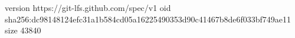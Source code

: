 version https://git-lfs.github.com/spec/v1
oid sha256:dc98148124efc31a1b584cd05a16225490353d90c41467b8de6f033bf749ae11
size 43840
